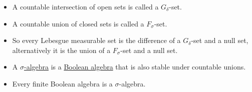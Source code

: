 \documentclass{article}
\newcommand{\1}[1]{\mathbbm{1}_{#1}}
\begin{document}
\begin{remark}
    \leavevmode
    \begin{itemize}
        \item A countable intersection of open sets is called a $G_{\delta}$-set.
        \item A countable union of closed sets is called a $F_{\sigma}$-set.
        \item So every Lebesgue measurable set is the difference of a $G_{\delta}$-set and a null set, alternatively it is the union of a $F_{\sigma}$-set and a null set.
    \end{itemize}
\end{remark}


\begin{remark}
    \leavevmode
    \begin{itemize}
        \item A \hyperlink{def:sigAlg}{$\sigma$-algebra} is a \hyperlink{def:boolAlg}{Boolean algebra} that is also stable under countable unions.
        \item Every finite Boolean algebra is a $\sigma$-algebra.
    \end{itemize}
\end{remark}
\end{document}
